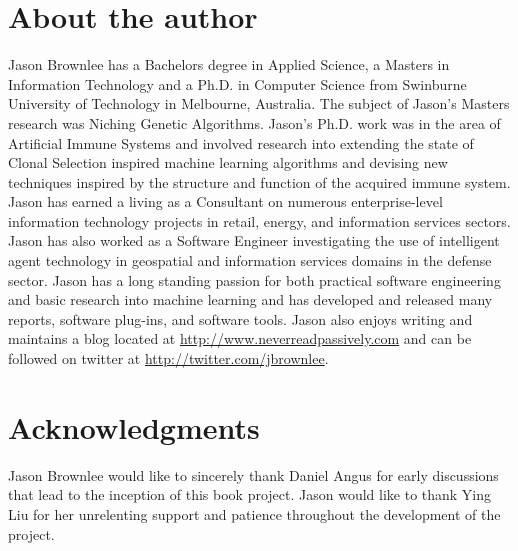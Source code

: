 \section*{About the author}
Jason Brownlee has a Bachelors degree in Applied Science, a Masters in Information Technology and a Ph.D. in Computer Science from Swinburne University of Technology in Melbourne, Australia. The subject of Jason's Masters research was Niching Genetic Algorithms. Jason's Ph.D. work was in the area of Artificial Immune Systems and involved research into extending the state of Clonal Selection inspired machine learning algorithms and devising new techniques inspired by the structure and function of the acquired immune system.
Jason has earned a living as a Consultant on numerous enterprise-level information technology projects in retail, energy, and information services sectors. Jason has also worked as a Software Engineer investigating the use of intelligent agent technology in geospatial and information services domains in the defense sector.
Jason has a long standing passion for both practical software engineering and basic research into machine learning and has developed and released many reports, software plug-ins, and software tools. Jason also enjoys writing and maintains a blog located at \url{http://www.neverreadpassively.com} and can be followed on twitter at \url{http://twitter.com/jbrownlee}. 

% 
% 
\section*{Acknowledgments}
Jason Brownlee would like to sincerely thank Daniel Angus for early discussions that lead to the inception of this book project.
Jason would like to thank Ying Liu for her unrelenting support and patience throughout the development of the project. 